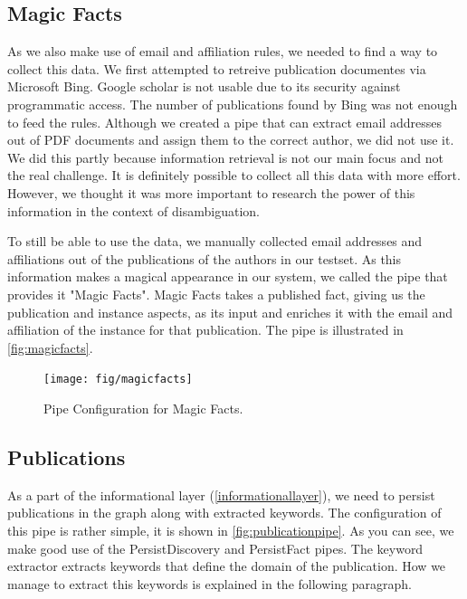 \subsection{Magic Facts}

As we also make use of email and affiliation rules, we needed to find a way to collect this data. We first attempted to retreive publication documentes via Microsoft Bing. Google scholar is not usable due to its security against programmatic access. The number of publications found by Bing was not enough to feed the rules. Although we created a pipe that can extract email addresses out of PDF documents and assign them to the correct author, we did not use it. We did this partly because information retrieval is not our main focus and not the real challenge. It is definitely possible to collect all this data with more effort. However, we thought it was more important to research the power of this information in the context of disambiguation.

To still be able to use the data, we manually collected email addresses and affiliations out of the publications of the authors in our testset. As this information makes a magical appearance in our system, we called the pipe that provides it "Magic Facts". Magic Facts takes a published fact, giving us the publication and instance aspects, as its input and enriches it with the email and affiliation of the instance for that publication. The pipe is illustrated in \autoref{fig:magicfacts}.

\begin{figure}[htb]
	\centering
		\texttt{[image: fig/magicfacts]}
	\caption{Pipe Configuration for Magic Facts.}
	\label{fig:magicfacts}
\end{figure}

\subsection{Publications}

As a part of the informational layer (\autoref{informationallayer}), we need to persist publications in the graph along with extracted keywords. The configuration of this pipe is rather simple, it is shown in \autoref{fig:publicationpipe}. As you can see, we make good use of the PersistDiscovery and PersistFact pipes. The keyword extractor extracts keywords that define the domain of the publication. How we manage to extract this keywords is explained in the following paragraph.

